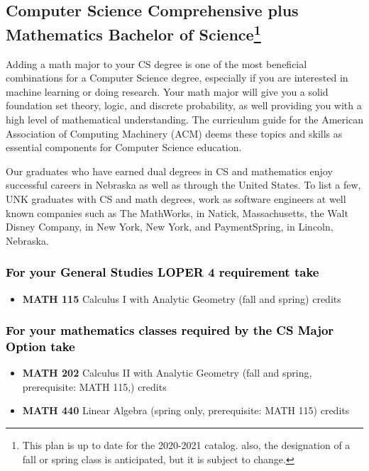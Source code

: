 \documentclass[9pt]{article}
\begin{document}
\vspace{-0.1in}
\subsection*{\textbf{\textcolor{unkblue}{Computer Science Comprehensive plus Mathematics Bachelor of Science\footnote[1]{This plan is up to date for the 2020-2021 catalog. also, the designation of a fall or spring class is anticipated, but it is subject to change.
}}}}

Adding a math major to your CS degree is one of the most beneficial combinations for a Computer Science degree, especially if you are interested in machine learning or doing research.  Your math major  will give you a solid foundation set theory, logic, and discrete probability, as well providing you with a high level of mathematical understanding.   The curriculum guide for the American Association of Computing Machinery (ACM) deems  these topics and skills  as essential components for  Computer Science education.

Our graduates who have  earned dual degrees in CS and mathematics enjoy successful careers in Nebraska as well as through the United States.  To list a few, UNK graduates with CS and math degrees, work as software engineers at well known companies such as The MathWorks, in Natick, Massachusetts, the Walt Disney Company, in New York, New York, and PaymentSpring, in Lincoln, Nebraska.



\subsubsection*{\textcolor{black}{For  your General Studies LOPER 4 requirement take}}
\begin{itemize}
\item \textbf{MATH 115} Calculus I with Analytic Geometry (fall and spring)  credits
\end{itemize}


\subsubsection*{\textcolor{black}{For your mathematics classes required by the CS Major Option take}}
\begin{itemize}
\item \textbf{MATH 202} Calculus II with Analytic Geometry (fall and spring,  prerequisite: MATH 115,)  credits
\item \textbf{MATH 440} Linear Algebra (spring only, prerequisite: MATH 115)  credits
\end{itemize}
\end{document}
